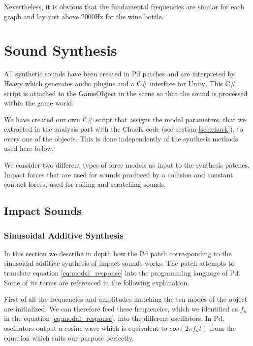 Nevertheless, it is obvious that the fundamental frequencies are similar for each graph and lay just above 2000Hz for the wine bottle.

\section{Sound Synthesis}\label{sec:synthesis_implem}

All synthetic sounds have been created in Pd patches and are interpreted by Heavy which generates audio plugins and a C\# interface for Unity\textsuperscript{\textregistered}. This C\# script is attached to the GameObject in the scene so that the sound is processed within the game world.

We have created our own C\# script that assigns the modal parameters, that we extracted in the analysis part with the ChucK code (see section \ref{sec:chuck}), to every one of the objects. This is done independently of the synthesis methods used here below.

We consider two different types of force models as input to the synthesis patches. Impact forces that are used for sounds produced by a collision and constant contact forces, used for rolling and scratching sounds.



\subsection{Impact Sounds}
%
\subsubsection{Sinusoidal Additive Synthesis}

In this section we describe in depth how the Pd patch corresponding to the sinusoidal additive synthesis of impact sounds works. The patch attempts to translate equation \ref{eq:modal_response} into the programming language of Pd. Some of its terms are referenced in the following explanation.

First of all the frequencies and amplitudes matching the ten modes of the object are initialized. We can therefore feed these frequencies, which we identified as $f_n$ in the equation \ref{eq:modal_response}, into the different oscillators. In Pd, oscillators output a cosine wave which is equivalent to $cos(2 \pi f_nt)$ from the equation which suits our purpose perfectly.

